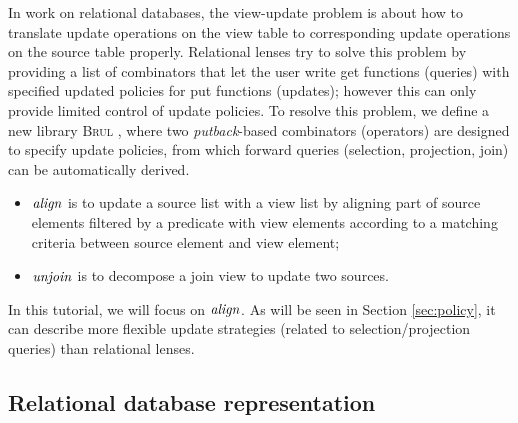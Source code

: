 In work on relational databases, the view-update problem is about how
to translate update operations on the view table to corresponding
update operations on the source table properly. Relational
lenses \cite{Bohannon:2006:RLL:1142351.1142399} try to solve this
problem by providing a list of combinators that let the user write get
functions (queries) with specified updated policies for put functions
(updates); however this can only provide limited control of update
policies. To resolve this problem, we define a new library \textsc{Brul} \cite{ZanLKH16},
where two \emph{putback}-based combinators (operators) are designed
to specify update policies, from which forward queries (selection, projection, join)
can be automatically derived.
\begin{itemize}
\item \ensuremath{\Varid{align}} is to update a source list with a view list by aligning part of source elements filtered by a predicate with view elements according to a matching criteria between source element and view element;
%
\item \ensuremath{\Varid{unjoin}} is to decompose a join view to update two sources.
\end{itemize}

In this tutorial, we will focus on \ensuremath{\Varid{align}}. As will be seen in Section
\ref{sec:policy}, it can describe more flexible update strategies
(related to selection/projection queries) than relational lenses. 

\subsection{Relational database representation}
\label{sec:table}


